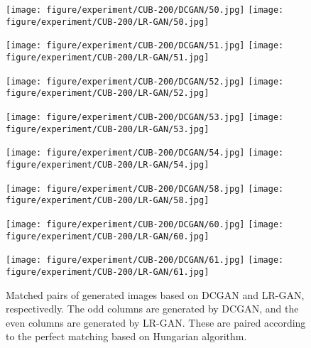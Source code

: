 \documentclass{article} \usepackage{iclr2017_conference,times}
\begin{document}
\begin{figure}[b]
\begin{minipage}{0.12\linewidth}
\texttt{[image: figure/experiment/CUB-200/DCGAN/50.jpg]}
\texttt{[image: figure/experiment/CUB-200/LR-GAN/50.jpg]}
\vspace{0.05cm}
\end{minipage}
\begin{minipage}{0.12\linewidth}
\texttt{[image: figure/experiment/CUB-200/DCGAN/51.jpg]}
\texttt{[image: figure/experiment/CUB-200/LR-GAN/51.jpg]}
\vspace{0.05cm}
\end{minipage}
\begin{minipage}{0.12\linewidth}
\texttt{[image: figure/experiment/CUB-200/DCGAN/52.jpg]}
\texttt{[image: figure/experiment/CUB-200/LR-GAN/52.jpg]}
\vspace{0.05cm}
\end{minipage}
\begin{minipage}{0.12\linewidth}
\texttt{[image: figure/experiment/CUB-200/DCGAN/53.jpg]}
\texttt{[image: figure/experiment/CUB-200/LR-GAN/53.jpg]}
\vspace{0.05cm}
\end{minipage}
\begin{minipage}{0.12\linewidth}
\texttt{[image: figure/experiment/CUB-200/DCGAN/54.jpg]}
\texttt{[image: figure/experiment/CUB-200/LR-GAN/54.jpg]}
\vspace{0.05cm}
\end{minipage}
\begin{minipage}{0.12\linewidth}
\texttt{[image: figure/experiment/CUB-200/DCGAN/58.jpg]}
\texttt{[image: figure/experiment/CUB-200/LR-GAN/58.jpg]}
\vspace{0.05cm}
\end{minipage}
\begin{minipage}{0.12\linewidth}
\texttt{[image: figure/experiment/CUB-200/DCGAN/60.jpg]}
\texttt{[image: figure/experiment/CUB-200/LR-GAN/60.jpg]}
\vspace{0.05cm}
\end{minipage}
\begin{minipage}{0.12\linewidth}
\texttt{[image: figure/experiment/CUB-200/DCGAN/61.jpg]}
\texttt{[image: figure/experiment/CUB-200/LR-GAN/61.jpg]}
\vspace{0.05cm}
\end{minipage}
\caption{Matched pairs of generated images based on DCGAN and LR-GAN, respectivedly. The odd columns are generated by DCGAN, and the even columns are generated by LR-GAN. These are paired according to the perfect matching based on Hungarian algorithm.}
\label{Fig_CUBComparison}
\end{figure}
\end{document}
